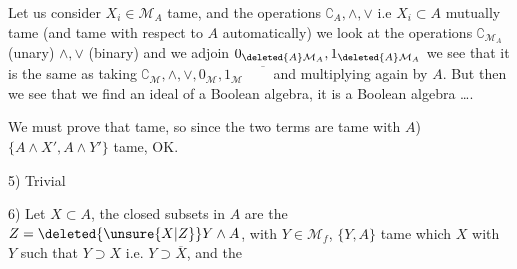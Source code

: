 Let us consider $X_i\in \mathcal M_A$  tame, and the operations $\complement_A,\wedge,\vee$  i.e $X_i\subset A$ mutually tame (and tame with respect to $A$ automatically) we look at the operations
  $\complement_{\mathcal M_A}$ (unary) $\wedge,\vee$ (binary) and we adjoin $0_{\deleted{A}\mathcal M_A},1_{\deleted{A}\mathcal M_A}$\unsure{)|,} we see that it is the same as
 taking $\complement_{\mathcal M},\wedge,\vee,0_{\mathcal M},1_{\mathcal M}\quad\overline{\phantom X}$ and multiplying again by $A$. But
then we see that we find an ideal of a Boolean algebra, it is a Boolean algebra \ldots.

 We must prove that
tame, so since  the two terms are tame with $A$) $\{A\wedge X',A\wedge Y'\}$ tame, OK.

5) Trivial

6) Let $X\subset A$, the closed subsets in $A$ are the $Z=\deleted{\unsure{X|Z}}Y\wedge A$, with $Y\in \mathcal M_f$, $\{Y,A\}$ tame   which  $X$   with $Y$ such that $Y\supset X$ i.e. $Y\supset\overline X$, and the
